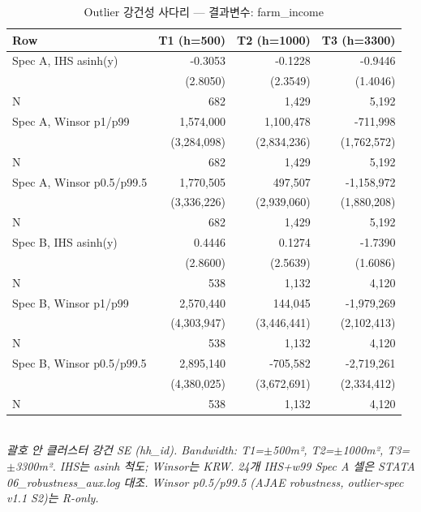 \begin{table}[t]
\centering
\caption{Outlier 강건성 사다리 — 결과변수: farm\_income}
\label{tab:rob_outlier_farm_income_ko}
\begin{tabular}{lrrr}
\toprule
Row & T1 (h=500) & T2 (h=1000) & T3 (h=3300) \\
\midrule
Spec A, IHS asinh(y) & -0.3053 & -0.1228 & -0.9446 \\
        & (2.8050) & (2.3549) & (1.4046) \\
N       & 682 & 1,429 & 5,192 \\
Spec A, Winsor p1/p99 & 1,574,000 & 1,100,478 & -711,998 \\
        & (3,284,098) & (2,834,236) & (1,762,572) \\
N       & 682 & 1,429 & 5,192 \\
Spec A, Winsor p0.5/p99.5 & 1,770,505 & 497,507 & -1,158,972 \\
        & (3,336,226) & (2,939,060) & (1,880,208) \\
N       & 682 & 1,429 & 5,192 \\
Spec B, IHS asinh(y) & 0.4446 & 0.1274 & -1.7390 \\
        & (2.8600) & (2.5639) & (1.6086) \\
N       & 538 & 1,132 & 4,120 \\
Spec B, Winsor p1/p99 & 2,570,440 & 144,045 & -1,979,269 \\
        & (4,303,947) & (3,446,441) & (2,102,413) \\
N       & 538 & 1,132 & 4,120 \\
Spec B, Winsor p0.5/p99.5 & 2,895,140 & -705,582 & -2,719,261 \\
        & (4,380,025) & (3,672,691) & (2,334,412) \\
N       & 538 & 1,132 & 4,120 \\
\bottomrule
\end{tabular}
\\
\footnotesize\textit{괄호 안 클러스터 강건 SE (hh\_id). Bandwidth: T1=$\pm$500m², T2=$\pm$1000m², T3=$\pm$3300m². IHS는 asinh 척도; Winsor는 KRW. 24개 IHS+w99 Spec A 셀은 STATA 06\_robustness\_aux.log 대조. Winsor p0.5/p99.5 (AJAE robustness, outlier-spec v1.1 S2)는 R-only.}
\end{table}


